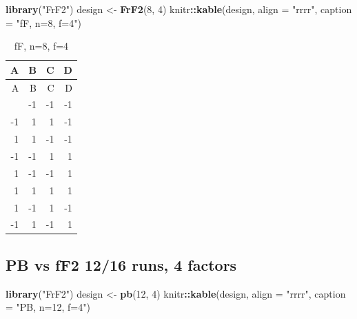 \documentclass[
  12pt,
  a4paper,
]{article}
\newenvironment{Shaded}{\begin{snugshade}}{\end{snugshade}}
\newcommand{\AttributeTok}[1]{\textcolor[rgb]{0.13,0.29,0.53}{#1}}
\newcommand{\DecValTok}[1]{\textcolor[rgb]{0.00,0.00,0.81}{#1}}
\newcommand{\FunctionTok}[1]{\textcolor[rgb]{0.13,0.29,0.53}{\textbf{#1}}}
\newcommand{\NormalTok}[1]{#1}
\newcommand{\OtherTok}[1]{\textcolor[rgb]{0.56,0.35,0.01}{#1}}
\newcommand{\SpecialCharTok}[1]{\textcolor[rgb]{0.81,0.36,0.00}{\textbf{#1}}}
\newcommand{\StringTok}[1]{\textcolor[rgb]{0.31,0.60,0.02}{#1}}
\numberwithin{equation}{section}
\theoremstyle{plain}
\theoremstyle{definition}
\theoremstyle{remark}
\theoremstyle{note}
\begin{document}
\begin{Shaded}
\begin{Highlighting}[]
\FunctionTok{library}\NormalTok{(}\StringTok{"FrF2"}\NormalTok{)}
\NormalTok{design }\OtherTok{\textless{}{-}} \FunctionTok{FrF2}\NormalTok{(}\DecValTok{8}\NormalTok{, }\DecValTok{4}\NormalTok{)}
\NormalTok{knitr}\SpecialCharTok{::}\FunctionTok{kable}\NormalTok{(design, }\AttributeTok{align =} \StringTok{"rrrr"}\NormalTok{, }\AttributeTok{caption =} \StringTok{"fF, n=8, f=4"}\NormalTok{)}
\end{Highlighting}
\end{Shaded}

\begin{longtable}[]{@{}rrrr@{}}
\caption{fF, n=8, f=4}\tabularnewline
\toprule\noalign{}
A & B & C & D \\
\midrule\noalign{}
\endfirsthead
\toprule\noalign{}
A & B & C & D \\
\midrule\noalign{}
\endhead
\bottomrule\noalign{}
\endlastfoot
-1 & -1 & -1 & -1 \\
-1 & 1 & 1 & -1 \\
1 & 1 & -1 & -1 \\
-1 & -1 & 1 & 1 \\
1 & -1 & -1 & 1 \\
1 & 1 & 1 & 1 \\
1 & -1 & 1 & -1 \\
-1 & 1 & -1 & 1 \\
\end{longtable}

\newpage

\hypertarget{pb-vs-ff2-1216-runs-4-factors}{%
\subsection{PB vs fF2 12/16 runs, 4
factors}\label{pb-vs-ff2-1216-runs-4-factors}}

\begin{Shaded}
\begin{Highlighting}[]
\FunctionTok{library}\NormalTok{(}\StringTok{"FrF2"}\NormalTok{)}
\NormalTok{design }\OtherTok{\textless{}{-}} \FunctionTok{pb}\NormalTok{(}\DecValTok{12}\NormalTok{, }\DecValTok{4}\NormalTok{)}
\NormalTok{knitr}\SpecialCharTok{::}\FunctionTok{kable}\NormalTok{(design, }\AttributeTok{align =} \StringTok{"rrrr"}\NormalTok{, }\AttributeTok{caption =} \StringTok{"PB, n=12, f=4"}\NormalTok{)}
\end{Highlighting}
\end{Shaded}
\end{document}
